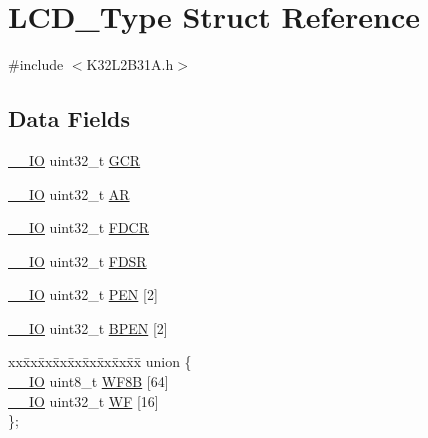 \hypertarget{struct_l_c_d___type}{}\section{L\+C\+D\+\_\+\+Type Struct Reference}
\label{struct_l_c_d___type}


{\ttfamily \#include $<$K32\+L2\+B31\+A.\+h$>$}

\subsection*{Data Fields}
\begin{DoxyCompactItemize}
\item 
\mbox{\hyperlink{core__cm0plus_8h_aec43007d9998a0a0e01faede4133d6be}{\+\_\+\+\_\+\+IO}} uint32\+\_\+t \mbox{\hyperlink{struct_l_c_d___type_aae092d9d07574afe1fbc79c8bf7f7c19}{G\+CR}}
\item 
\mbox{\hyperlink{core__cm0plus_8h_aec43007d9998a0a0e01faede4133d6be}{\+\_\+\+\_\+\+IO}} uint32\+\_\+t \mbox{\hyperlink{struct_l_c_d___type_a2ac50357d1ebac2949d27bfc4855e6a4}{AR}}
\item 
\mbox{\hyperlink{core__cm0plus_8h_aec43007d9998a0a0e01faede4133d6be}{\+\_\+\+\_\+\+IO}} uint32\+\_\+t \mbox{\hyperlink{struct_l_c_d___type_aaae4fdf0b16483015bdf37fefd65a3ae}{F\+D\+CR}}
\item 
\mbox{\hyperlink{core__cm0plus_8h_aec43007d9998a0a0e01faede4133d6be}{\+\_\+\+\_\+\+IO}} uint32\+\_\+t \mbox{\hyperlink{struct_l_c_d___type_a60e603662731cb78500abe693fa249ee}{F\+D\+SR}}
\item 
\mbox{\hyperlink{core__cm0plus_8h_aec43007d9998a0a0e01faede4133d6be}{\+\_\+\+\_\+\+IO}} uint32\+\_\+t \mbox{\hyperlink{struct_l_c_d___type_aad6a2a460a8c1f3dc80dcf4b62535de7}{P\+EN}} \mbox{[}2\mbox{]}
\item 
\mbox{\hyperlink{core__cm0plus_8h_aec43007d9998a0a0e01faede4133d6be}{\+\_\+\+\_\+\+IO}} uint32\+\_\+t \mbox{\hyperlink{struct_l_c_d___type_a3027e062c8f29fc0875cebed5d54d586}{B\+P\+EN}} \mbox{[}2\mbox{]}
\item 
\mbox{\label{struct_l_c_d___type_ad85bd7ed8784d28cad12e663f6c4aa93}} 
\begin{tabbing}
xx\=xx\=xx\=xx\=xx\=xx\=xx\=xx\=xx\=\kill
union \{\\
\>\mbox{\hyperlink{core__cm0plus_8h_aec43007d9998a0a0e01faede4133d6be}{\_\_IO}} uint8\_t \mbox{\hyperlink{struct_l_c_d___type_af794dc38bc12d5df18f48d0c1cce9369}{WF8B}} \mbox{[}64\mbox{]}\\
\>\mbox{\hyperlink{core__cm0plus_8h_aec43007d9998a0a0e01faede4133d6be}{\_\_IO}} uint32\_t \mbox{\hyperlink{struct_l_c_d___type_a41cb7fd96eed5cdaed3bb04468d3e4dc}{WF}} \mbox{[}16\mbox{]}\\
\}; \\

\end{tabbing}\end{DoxyCompactItemize}


